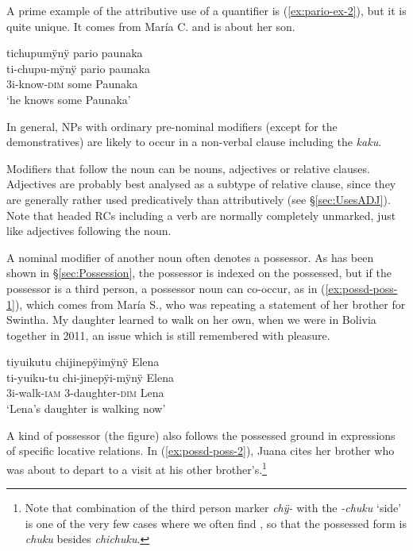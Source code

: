 A prime example of the attributive use of a quantifier is (\ref{ex:pario-ex-2}), but it is quite unique. It comes from María C. and is about her son.

\ea\label{ex:pario-ex-2}
\begingl
\glpreamble tichupumÿnÿ pario paunaka\\
\gla ti-chupu-mÿnÿ pario paunaka\\
\glb 3i-know-\textsc{dim} some Paunaka\\
\glft ‘he knows some Paunaka’
\endgl
\trailingcitation{[cux-c120414ls-2.269]}
\xe
{}

In general, NPs with ordinary pre-nominal modifiers (except for the demonstratives) are likely to occur in a non-verbal clause including the  \textit{kaku}.

Modifiers that follow the noun can be nouns, adjectives or relative clauses. Adjectives are probably best analysed as a subtype of relative clause, since they are generally rather used predicatively than attributively (see §\ref{sec:UsesADJ}). Note that headed RCs including a verb are normally completely unmarked, just like adjectives following the noun.

A nominal modifier of another noun often denotes a possessor. As has been shown in §\ref{sec:Possession}, the possessor is indexed on the possessed, but if the possessor is a third person, a possessor noun can co-occur, as in (\ref{ex:possd-poss-1}), which comes from María S., who was repeating a statement of her brother for Swintha. My daughter learned to walk on her own, when we were in Bolivia together in 2011, an issue which is still remembered with pleasure.

\ea\label{ex:possd-poss-1}
\begingl
\glpreamble tiyuikutu chijinepÿimÿnÿ Elena\\
\gla ti-yuiku-tu chi-jinepÿi-mÿnÿ Elena\\
\glb 3i-walk-\textsc{iam} 3-daughter-\textsc{dim} Lena\\
\glft ‘Lena’s daughter is walking now’
\endgl
\trailingcitation{[rxx-e121128s-1.071]}
\xe

A kind of possessor (the figure) also follows the possessed ground in expressions of specific locative relations. In (\ref{ex:possd-poss-2}), Juana cites her brother who was about to depart to a visit at his other brother’s.\footnote{Note that combination of the third person marker \textit{chÿ-} with the  \textit{-chuku} ‘side’ is one of the very few cases where we often find , so that the possessed form is \textit{chuku} besides \textit{chichuku}.}

